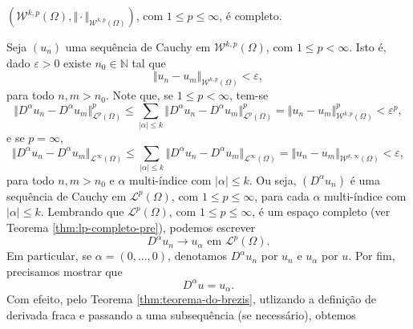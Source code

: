 \documentclass[a4paper, 11pt]{book}
\theoremstyle{definition}
\newcommand{\bN}{\mathbb{N}}
\newcommand{\cL}{\mathcal{L}}
\newcommand{\cW}{\mathcal{W}}
\begin{document}
\begin{tbox} \label{thm:sobolev-completo}
    $(\cW^{k,p}(\Omega), \Vert \cdot \Vert_{\cW^{k,p}(\Omega)})$, com $1 \leqslant p \leqslant \infty$, é completo.
\end{tbox}
\begin{prf}
    Seja $(u_n)$ uma sequência de Cauchy em $\cW^{k,p}(\Omega)$, com $1 \leqslant p < \infty$. Isto é, dado $\varepsilon > 0$ existe $n_0 \in \bN$ tal que
    \[
        \Vert u_n - u_m \Vert_{\cW^{k,p}(\Omega)} < \varepsilon,
    \]
    para todo $n,m > n_0$.
    Note que, se $1 \leqslant p < \infty$, tem-se
    \[
        \Vert D^\alpha u_n - D^\alpha u_m \Vert_{\cL^p(\Omega)}^p \leqslant \sum_{|\alpha| \leqslant k} \Vert D^\alpha u_n - D^\alpha u_m \Vert_{\cL^p(\Omega)}^p = \Vert u_n - u_m \Vert_{\cW^{k,p}(\Omega)}^p < \varepsilon^p,
    \]
    e se $p = \infty$,
    \[
        \Vert D^\alpha u_n - D^\alpha u_m \Vert_{\cL^\infty(\Omega)} \leqslant \sum_{|\alpha| \leqslant k} \Vert D^\alpha u_n - D^\alpha u_m \Vert_{\cL^\infty(\Omega)} = \Vert u_n - u_m \Vert_{\cW^{k,\infty}(\Omega)} < \varepsilon,
    \]
    para todo $n,m > n_0$ e $\alpha$ multi-índice com $|\alpha| \leqslant k$. Ou seja, $(D^\alpha u_n)$ é uma sequência de Cauchy em $\cL^p(\Omega)$, com $1 \leqslant p \leqslant \infty$, para cada $\alpha$ multi-índice com $|\alpha| \leqslant k$. Lembrando que $\cL^p(\Omega)$, com $1 \leqslant p \leqslant \infty$, é um espaço completo (ver Teorema \ref{thm:lp-completo-pre}), podemos escrever
    \begin{equation} \label{eq:Dalfaun}
        D^\alpha u_n \to u_\alpha \text{ em } \cL^p(\Omega).
    \end{equation}
    Em particular, se $\alpha = (0,\dots,0)$, denotamos $D^\alpha u_n$ por $u_n$ e $u_\alpha$ por $u$.
    Por fim, precisamos mostrar que
    \[
        D^\alpha u = u_\alpha.
    \]
Com efeito, pelo Teorema \ref{thm:teorema-do-brezis}, utlizando a definição de derivada fraca e passando a uma subsequência (se necessário), obtemos
    \[
        \begin{aligned}

\end{aligned}\]
\end{prf}
\end{document}
